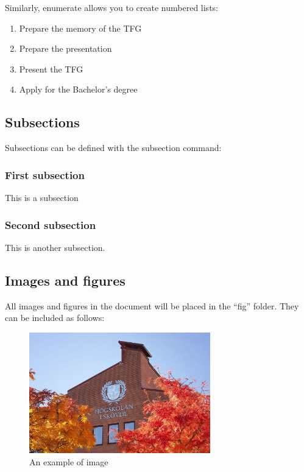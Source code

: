 Similarly, enumerate allows you to create numbered lists:

\begin{enumerate}
  \item Prepare the memory of the TFG
  \item Prepare the presentation
  \item Present the TFG
  \item Apply for the Bachelor's degree
\end{enumerate}

\subsection{Subsections}
Subsections can be defined with the subsection command:

\subsubsection{First subsection}\label{sec:subsection}
This is a subsection

\subsubsection{Second subsection}
This is another subsection.

\subsection{Images and figures}
All images and figures in the document will be placed in the ``fig'' folder. They can be included as follows:

\begin{figure}[htp]
  \centering
  \includegraphics[width=0.7\textwidth]{images/skovde.jpg}
  \caption{An example of image}
  \label{fig:example}
\end{figure}

